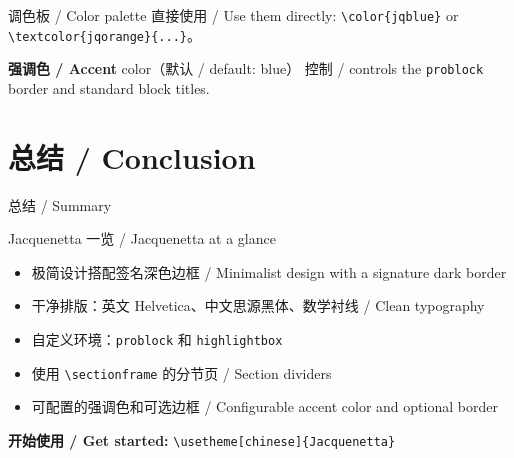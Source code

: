 \documentclass[aspectratio=169]{beamer}
\begin{document}
\begin{frame}{调色板 / Color palette}
    \vspace{0.6cm}
    直接使用 / Use them directly: \texttt{\textbackslash color\{jqblue\}} or
    \texttt{\textbackslash textcolor\{jqorange\}\{...\}}。

    \vspace{0.2cm}
    \textbf{强调色 / Accent} color（默认 / default: {\color{jqaccent}blue}）
    控制 / controls the \texttt{problock} border and standard block titles.
\end{frame}

\section{总结 / Conclusion}


\begin{frame}{总结 / Summary}
    \begin{problock}{Jacquenetta 一览 / Jacquenetta at a glance}
        \begin{itemize}
            \item 极简设计搭配签名深色边框 / Minimalist design with a signature dark border
            \item 干净排版：英文 Helvetica、中文思源黑体、数学衬线 / Clean typography
            \item 自定义环境：\texttt{problock} 和 \texttt{highlightbox}
            \item 使用 \texttt{\textbackslash sectionframe} 的分节页 / Section dividers
            \item 可配置的强调色和可选边框 / Configurable accent color and optional border
        \end{itemize}
    \end{problock}

    \vspace{0.3cm}
    \begin{highlightbox}
        \centering
        \textbf{开始使用 / Get started:}\quad
        \texttt{\textbackslash usetheme[chinese]\{Jacquenetta\}}
    \end{highlightbox}
\end{frame}

\end{document}
